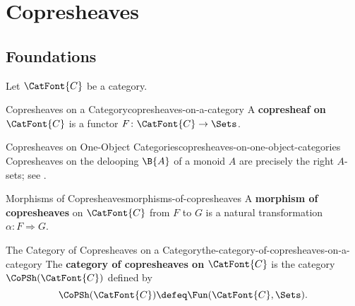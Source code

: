 \section{Copresheaves}\label{section-copresheaves}
\subsection{Foundations}\label{subsection-copresheaves-foundations}
Let $\CatFont{C}$ be a category.
\begin{definition}{Copresheaves on a Category}{copresheaves-on-a-category}%
    A \textbf{copresheaf on $\CatFont{C}$} is a functor $F\colon\CatFont{C}\to\Sets$.
\end{definition}
\begin{example}{Copresheaves on One-Object Categories}{copresheaves-on-one-object-categories}%
    Copresheaves on the delooping $\B{A}$ of a monoid $A$ are precisely the right $A$-sets; see .
\end{example}
\begin{definition}{Morphisms of Copresheaves}{morphisms-of-copresheaves}%
    A \textbf{morphism of copresheaves} on $\CatFont{C}$ from $F$ to $G$ is a natural transformation $\alpha\colon F\Rightarrow G$.
\end{definition}
\begin{definition}{The Category of Copresheaves on a Category}{the-category-of-copresheaves-on-a-category}%
    The \textbf{category of copresheaves on $\CatFont{C}$} is the category $\CoPSh(\CatFont{C})$ defined by
    \[
        \CoPSh(\CatFont{C})
        \defeq
        \Fun(\CatFont{C},\Sets).
    \]%
\end{definition}
